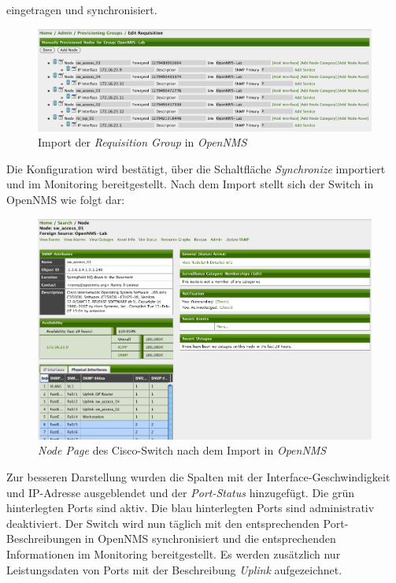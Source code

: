 eingetragen und synchronisiert.

\begin{figure}[H]
	\centering
	\includegraphics[width=1.0\textwidth]{images/use-cases/monitoring-layer-2/requisition-import}
	\caption{Import der \textit{Requisition Group} in \textit{OpenNMS}}
	\label{pic:requisition-import}
\end{figure}

Die Konfiguration wird bestätigt, über die Schaltfläche \textit{Synchronize} importiert und im Monitoring bereitgestellt. Nach dem Import stellt sich der Switch in OpenNMS wie folgt dar:

\begin{figure}[H]
	\centering
	\includegraphics[width=1.0\textwidth]{images/use-cases/monitoring-layer-2/node-page}
	\caption{\textit{Node Page} des Cisco-Switch nach dem Import in \textit{OpenNMS}}
	\label{pic:node-page}
\end{figure}

Zur besseren Darstellung wurden die Spalten mit der Interface-Geschwindigkeit und IP-Adresse ausgeblendet und der \textit{Port-Status} hinzugefügt. Die grün hinterlegten Ports sind aktiv. Die blau hinterlegten Ports sind administrativ deaktiviert. Der Switch wird nun täglich  mit den entsprechenden Port-Beschreibungen in OpenNMS synchronisiert und die entsprechenden Informationen im Monitoring bereitgestellt. Es werden zusätzlich nur Leistungsdaten von Ports mit der Beschreibung \textit{Uplink} aufgezeichnet.

